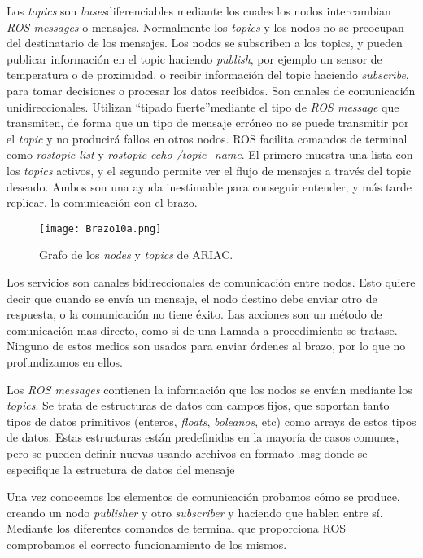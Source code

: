 Los \textit{topics} son \textit{buses}diferenciables mediante los cuales los nodos intercambian \textit{ROS messages} o mensajes. Normalmente los \textit{topics} y los nodos no se preocupan del destinatario de los mensajes. Los nodos se subscriben a los topics, y pueden publicar información en el topic haciendo \textit{publish}, por ejemplo un sensor de temperatura o de proximidad, o recibir información del topic haciendo \textit{subscribe}, para tomar decisiones o procesar los datos recibidos. Son canales de comunicación unidireccionales. Utilizan \textquotedblleft tipado fuerte\textquotedblright  mediante el tipo de \textit{ROS message} que transmiten, de forma que un tipo de mensaje erróneo no se puede transmitir por el \textit{topic} y no producirá fallos en otros nodos. ROS facilita comandos de terminal como \textit{rostopic list} y \textit{rostopic echo /topic\_name}. El primero muestra una lista con los \textit{topics} activos, y el segundo permite ver el flujo de mensajes a través del topic deseado. Ambos son una ayuda inestimable para conseguir entender, y más tarde replicar, la comunicación con el brazo.

\begin{figure}[]
	\centering\texttt{[image: Brazo10a.png]}
	\caption{Grafo de los \textit{nodes} y \textit{topics} de ARIAC.}
	\label{fig:ariacgraph1}
\end{figure}

Los servicios son canales bidireccionales de comunicación entre nodos. Esto quiere decir que cuando se envía un mensaje, el nodo destino debe enviar otro de respuesta, o la comunicación no tiene éxito. Las acciones son un método de comunicación mas directo, como si de una llamada a procedimiento se tratase. Ninguno de estos medios son usados para enviar órdenes al brazo, por lo que no profundizamos en ellos.

Los \textit{ROS messages} contienen la información que los nodos se envían mediante los \textit{topics}. Se trata de estructuras de datos con campos fijos, que soportan tanto tipos de datos primitivos (enteros, \textit{floats}, \textit{boleanos}, etc) como arrays de estos tipos de datos. Estas estructuras están predefinidas en la mayoría de casos comunes, pero se pueden definir nuevas usando archivos en formato .msg donde se especifique la estructura de datos del mensaje

Una vez conocemos los elementos de comunicación probamos cómo se produce, creando un nodo \textit{publisher} y otro \textit{subscriber} y haciendo que hablen entre sí. Mediante los diferentes comandos de terminal que proporciona ROS comprobamos el correcto funcionamiento de los mismos. 

